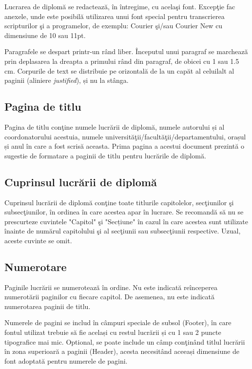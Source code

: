 Lucrarea de diplomă se redactează, în întregime, cu acelaşi font. Excepţie fac anexele, unde este posibilă utilizarea unui font special pentru transcrierea scripturilor şi a programelor, de exemplu: Courier şi/sau Courier New cu dimensiune de 10 sau 11pt.

Paragrafele se despart printr-un rând liber. Începutul unui paragraf se marchează prin deplasarea la dreapta a primului rând din paragraf, de obicei cu 1 sau 1.5 cm. Corpurile de text se distribuie pe orizontală de la un capăt al celuilalt al paginii (aliniere \emph{justified}), și nu la stânga. 

\subsection{Pagina de titlu} 
Pagina de titlu conţine numele lucrării de diplomă, numele autorului și al coordonatorului acestuia, numele universităţii/facultăţii/departamentului, orașul și anul în care a fost scrisă aceasta. Prima pagina a acestui document prezintă o sugestie de formatare a paginii de titlu pentru lucrările de diplomă.

\subsection{Cuprinsul lucrării de diplomă} 
Cuprinsul lucrării de diplomă conţine toate titlurile capitolelor, secţiunilor şi subsecţiunilor, în ordinea în care acestea apar în lucrare. Se recomandă să nu se prescurteze cuvintele "Capitol" şi "Secțiune" în cazul în care acestea sunt utilizate înainte de numărul capitolului şi al secţiunii sau subsecţiunii respective. Uzual, aceste cuvinte se omit.

\subsection{Numerotare}

Paginile lucrării se numerotează în ordine. Nu este indicată reînceperea numerotării paginilor cu fiecare capitol. De asemenea, nu este indicată numerotarea paginii de titlu.

Numerele de pagini se includ în câmpuri speciale de subsol (Footer), în care fontul utilizat trebuie să fie același cu restul lucrării și cu 1 sau 2 puncte tipografice mai mic. Optional, se poate include un câmp conţinând titlul lucrării în zona superioară a paginii (Header), acesta necesitând aceeași dimensiune de font adoptată pentru numerele de pagini.

